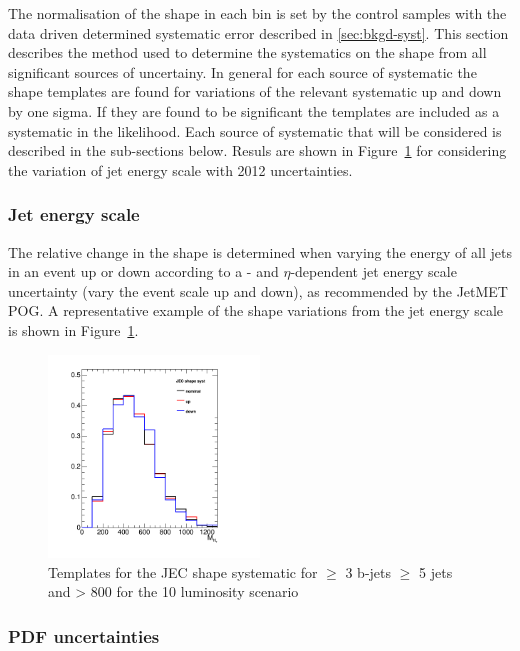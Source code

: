 The normalisation of the \mht shape in each \scalht bin is set by the control
samples with the data driven determined systematic error described in \ref{sec:bkgd-syst}.
This section describes the method used to determine the systematics on the shape
from all significant sources of uncertainy. In general for each source of systematic
the shape templates are found for variations of the relevant systematic up and down by 
one sigma. If they are found to be significant the templates are included as a systematic in the likelihood. 
Each source of systematic that will be considered is described in the sub-sections below. 
Resuls are shown in Figure~\ref{fig:jec-shape} for considering the variation of jet energy scale with 2012 uncertainties.

\subsubsection{Jet energy scale\label{sec:sms-syst-jes}}
The relative change in the \mht shape is
determined when varying the energy of all jets in an event up or down
according to a \pt- and $\eta$-dependent jet energy scale uncertainty
(\ie vary the event scale up and down), as recommended by the JetMET
POG. A representative example of the shape variations from the jet energy scale 
is shown in Figure~\ref{fig:jec-shape}.

\begin{figure}[]
  \centering
  \includegraphics[width=0.5\textwidth]{figures/closureTests/mhtJetSyst_SMS_T1bbbb_2J_mGl1000_mLSP900_JEC_ge3b_ge5j_800_1600.png}
  \caption{\label{fig:jec-shape} Templates for the JEC shape systematic for $\geq$ 3 b-jets $\geq$ 5 jets and \scalht > 800 for the 10 \ifb luminosity scenario}
\end{figure}

\subsubsection{PDF uncertainties\label{sec:pdf-sets}}


